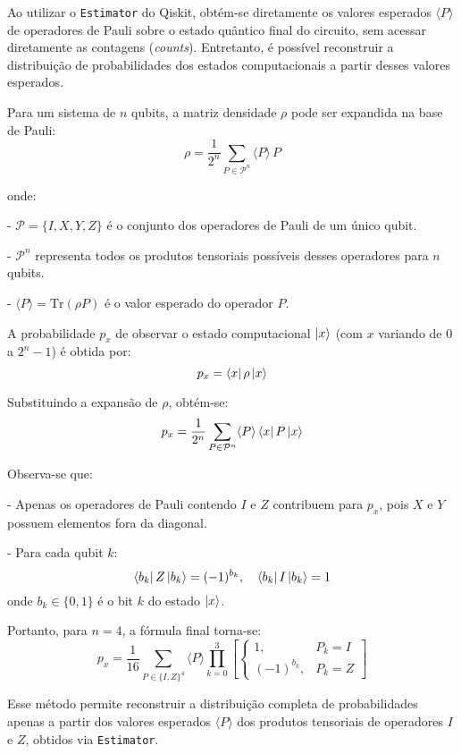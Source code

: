 \label{ap:apendiceD}

Ao utilizar o \texttt{Estimator} do Qiskit, obtém-se diretamente os valores esperados \(\langle P \rangle\) de operadores de Pauli sobre o estado quântico final do circuito, sem acessar diretamente as contagens (\textit{counts}). Entretanto, é possível reconstruir a distribuição de probabilidades dos estados computacionais a partir desses valores esperados.

Para um sistema de \(n\) qubits, a matriz densidade \(\rho\) pode ser expandida na base de Pauli:
%
\[
\rho = \frac{1}{2^n} \sum_{P \in \mathcal{P}^n} \langle P \rangle \, P
\]

onde:

- \(\mathcal{P} = \{I, X, Y, Z\}\) é o conjunto dos operadores de Pauli de um único qubit.

- \(\mathcal{P}^n\) representa todos os produtos tensoriais possíveis desses operadores
para \(n\) qubits.

- \(\langle P \rangle = \mathrm{Tr}(\rho P)\) é o valor esperado do operador \(P\).

A probabilidade \(p_x\) de observar o estado computacional \(\ket{x}\) (com \(x\) variando de \(0\) a \(2^n-1\)) é obtida por:
%
\[
p_x = \bra{x} \rho \ket{x}
\]

Substituindo a expansão de \(\rho\), obtém-se:
%
\[
p_x = \frac{1}{2^n} \sum_{P \in \mathcal{P}^n} \langle P \rangle \bra{x} P \ket{x}
\]

Observa-se que:

- Apenas os operadores de Pauli contendo \(I\) e \(Z\) contribuem para \(p_x\), pois \(X\) e \(Y\) possuem elementos fora da diagonal.

- Para cada qubit \(k\):
\[
\bra{b_k} Z \ket{b_k} = (-1)^{b_k}, \quad \bra{b_k} I \ket{b_k} = 1
\]
onde \(b_k \in \{0,1\}\) é o bit \(k\) do estado \(\ket{x}\).

Portanto, para \(n=4\), a fórmula final torna-se:
%
\[
p_x = \frac{1}{16} \sum_{P \in \{I,Z\}^4} \langle P \rangle \prod_{k=0}^{3} \left[ 
\begin{cases}
1, & P_k = I \\
(-1)^{b_k}, & P_k = Z
\end{cases} \right]
\]

Esse método permite reconstruir a distribuição completa de probabilidades apenas a partir dos valores esperados \(\langle P \rangle\) dos produtos tensoriais de operadores \(I\) e \(Z\), obtidos via \texttt{Estimator}.
